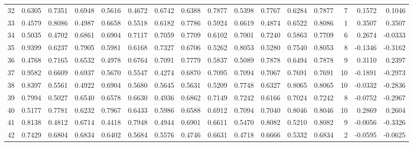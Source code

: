\begin{tabular}{lrrrrrrrrrrrrrrr}
32  &      0.6305 &  0.7351 &  0.6948 &  0.5616 &  0.4672 &  0.6742 &  0.6388 &  0.7877 &  0.5398 &  0.7767 &   0.6284 &     0.7877 &      7 &                    0.1572 &                     0.1046 \\
33  &      0.4579 &  0.8086 &  0.4987 &  0.6658 &  0.5518 &  0.6182 &  0.7786 &  0.5924 &  0.6619 &  0.4874 &   0.6522 &     0.8086 &      1 &                    0.3507 &                     0.3507 \\
34  &      0.5035 &  0.4702 &  0.6861 &  0.6904 &  0.7117 &  0.7059 &  0.7709 &  0.6102 &  0.7001 &  0.7240 &   0.5863 &     0.7709 &      6 &                    0.2674 &                    -0.0333 \\
35  &      0.9399 &  0.6237 &  0.7905 &  0.5981 &  0.6168 &  0.7327 &  0.6706 &  0.5262 &  0.8053 &  0.5280 &   0.7540 &     0.8053 &      8 &                   -0.1346 &                    -0.3162 \\
36  &      0.4768 &  0.7165 &  0.6532 &  0.4978 &  0.6764 &  0.7091 &  0.7779 &  0.5837 &  0.5089 &  0.7878 &   0.6494 &     0.7878 &      9 &                    0.3110 &                     0.2397 \\
37  &      0.9582 &  0.6609 &  0.6937 &  0.5670 &  0.5547 &  0.4274 &  0.6870 &  0.7095 &  0.7094 &  0.7067 &   0.7691 &     0.7691 &     10 &                   -0.1891 &                    -0.2973 \\
38  &      0.8397 &  0.5561 &  0.4922 &  0.6904 &  0.5680 &  0.5645 &  0.5631 &  0.5209 &  0.7748 &  0.6327 &   0.8065 &     0.8065 &     10 &                   -0.0332 &                    -0.2836 \\
39  &      0.7994 &  0.5027 &  0.6540 &  0.6578 &  0.6630 &  0.4936 &  0.6862 &  0.7149 &  0.7242 &  0.6166 &   0.7024 &     0.7242 &      8 &                   -0.0752 &                    -0.2967 \\
40  &      0.5177 &  0.7781 &  0.6232 &  0.7967 &  0.6433 &  0.5986 &  0.6588 &  0.6912 &  0.7094 &  0.7040 &   0.8046 &     0.8046 &     10 &                    0.2869 &                     0.2604 \\
41  &      0.8138 &  0.4812 &  0.6714 &  0.4418 &  0.7948 &  0.4944 &  0.6901 &  0.6611 &  0.5470 &  0.8082 &   0.5210 &     0.8082 &      9 &                   -0.0056 &                    -0.3326 \\
42  &      0.7429 &  0.6804 &  0.6834 &  0.6402 &  0.5684 &  0.5576 &  0.4746 &  0.6631 &  0.4718 &  0.6666 &   0.5332 &     0.6834 &      2 &                   -0.0595 &                    -0.0625 \\

\end{tabular}
